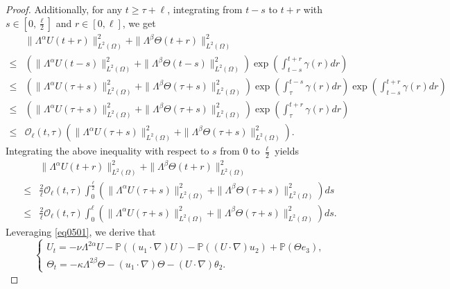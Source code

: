 \documentclass[oneside,preprint,12pt,numbers,sort&compress]{elsarticle}
\begin{document}
\begin{proof}
Additionally, for any $t \geq \tau + \ell$, integrating from $t-s$ to $t+r$ with $s\in [0,\frac{\ell}{2}]$ and $r\in [0,\ell]$, we get
\begin{align*}
&\| \Lambda^{\alpha}U(t+r) \|_{L^2(\Omega)}^{2} 
+ \| \Lambda^{\beta}\Theta (t+r) \|_{L^2(\Omega)}^{2} \\
\leq&
\left( \| \Lambda^{\alpha}U(t-s) \|_{L^2(\Omega)}^{2} 
+ \| \Lambda^{\beta}\Theta (t-s) \|_{L^2(\Omega)}^{2} \right)
\exp\left(\int_{t-s}^{t+r}
\gamma(r) dr\right)\\
\leq
& 
\left( \| \Lambda^{\alpha}U(\tau+s) \|_{L^2(\Omega)}^{2} 
+ \| \Lambda^{\beta}\Theta (\tau+s) \|_{L^2(\Omega)}^{2} \right)
\exp \left(\int_{\tau}^{t-s}
\gamma(r) dr \right)\exp\left(\int_{t-s}^{t+r}
\gamma(r) dr\right)\\
\leq
& 
\left( \| \Lambda^{\alpha}U(\tau+s) \|_{L^2(\Omega)}^{2} 
+ \| \Lambda^{\beta}\Theta (\tau+s) \|_{L^2(\Omega)}^{2} \right)
\exp \left(\int_{\tau}^{t+r}
\gamma(r) dr \right)\\
\leq &
\mathcal{O}_{\ell}(t,\tau)\left( \| \Lambda^{\alpha}U(\tau+s) \|_{L^2(\Omega)}^{2} 
+ \| \Lambda^{\beta}\Theta (\tau+s) \|_{L^2(\Omega)}^{2} \right).
\end{align*}
Integrating the above inequality with respect to $s$ from $0$ to $\frac{\ell}{2}$ yields
\begin{equation}\label{eq030808}
\begin{aligned}
&  \| \Lambda^{\alpha}U(t+r) \|_{L^2(\Omega)}^{2} 
+ \| \Lambda^{\beta}\Theta (t+r) \|_{L^2(\Omega)}^{2} \\
\leq & \frac{2}{\ell}
\mathcal{O}_{\ell}(t,\tau)\int_{0}^{\frac{\ell}{2}} \left( \| \Lambda^{\alpha}U(\tau+s) \|_{L^2(\Omega)}^{2} 
+ \| \Lambda^{\beta}\Theta (\tau+s) \|_{L^2(\Omega)}^{2} \right) ds \\
\leq & \frac{2}{\ell}
\mathcal{O}_{\ell}(t,\tau)\int_{0}^{\ell} \left( \| \Lambda^{\alpha}U(\tau+s) \|_{L^2(\Omega)}^{2} 
+ \| \Lambda^{\beta}\Theta (\tau+s) \|_{L^2(\Omega)}^{2} \right) ds.
\end{aligned}
\end{equation}
Leveraging \cref{eq0501}, we derive that 
\begin{equation*}
\begin{cases}
U_t = - \nu \Lambda^{2\alpha} U - \mathbb{P} \left( (u_1 \cdot \nabla) U \right) - \mathbb{P} \left( (U \cdot \nabla) u_2 \right) + \mathbb{P} (\Theta e_3), \\
\Theta_t = - \kappa \Lambda^{2\beta} \Theta - (u_1 \cdot \nabla) \Theta - (U \cdot \nabla) \theta_2.

\end{cases}
\end{equation*}
\end{proof}
\end{document}
